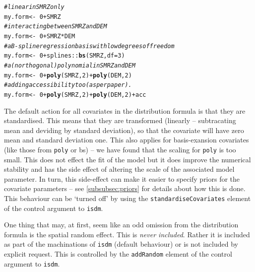 \documentclass[article,shortnames,nojss]{jss}\usepackage[]{graphicx}\usepackage[]{xcolor}
\makeatletter
\newcommand{\hlnum}[1]{\textcolor[rgb]{0.686,0.059,0.569}{#1}}%
\newcommand{\hlcom}[1]{\textcolor[rgb]{0.678,0.584,0.686}{\textit{#1}}}%
\newcommand{\hlopt}[1]{\textcolor[rgb]{0,0,0}{#1}}%
\newcommand{\hlstd}[1]{\textcolor[rgb]{0.345,0.345,0.345}{#1}}%
\newcommand{\hlkwb}[1]{\textcolor[rgb]{0.69,0.353,0.396}{#1}}%
\newcommand{\hlkwc}[1]{\textcolor[rgb]{0.333,0.667,0.333}{#1}}%
\newcommand{\hlkwd}[1]{\textcolor[rgb]{0.737,0.353,0.396}{\textbf{#1}}}%
\newenvironment{kframe}{%
 \def\at@end@of@kframe{}%
 \ifinner\ifhmode%
  \def\at@end@of@kframe{\end{minipage}}%
  \begin{minipage}{\columnwidth}%
 \fi\fi%
 \def\FrameCommand##1{\hskip\@totalleftmargin \hskip-\fboxsep
 \colorbox{shadecolor}{##1}\hskip-\fboxsep
     \hskip-\linewidth \hskip-\@totalleftmargin \hskip\columnwidth}%
 \MakeFramed {\advance\hsize-\width
   \@totalleftmargin\z@ \linewidth\hsize
   \@setminipage}}%
 {\par\unskip\endMakeFramed%
 \at@end@of@kframe}
\newenvironment{knitrout}{}{} %
\makeatother
\begin{document}
\begin{knitrout}
\color{fgcolor}\begin{kframe}
\begin{alltt}
\hlcom{#linear in SMRZ only}
\hlstd{my.form} \hlkwb{<-} \hlopt{~}\hlnum{0}\hlopt{+}\hlstd{SMRZ}
\hlcom{#interacting between SMRZ and DEM}
\hlstd{my.form} \hlkwb{<-} \hlopt{~}\hlnum{0}\hlopt{+}\hlstd{SMRZ}\hlopt{*}\hlstd{DEM}
\hlcom{#a B-spline regression basis with low degrees of freedom}
\hlstd{my.form} \hlkwb{<-} \hlopt{~}\hlnum{0}\hlopt{+}\hlstd{splines}\hlopt{::}\hlkwd{bs}\hlstd{(SMRZ,} \hlkwc{df}\hlstd{=}\hlnum{3}\hlstd{)}
\hlcom{#a(n orthogonal) polynomial in SMRZ and DEM}
\hlstd{my.form} \hlkwb{<-} \hlopt{~}\hlnum{0}\hlopt{+}\hlkwd{poly}\hlstd{(SMRZ,}\hlnum{2}\hlstd{)}\hlopt{+}\hlkwd{poly}\hlstd{(DEM,}\hlnum{2}\hlstd{)}
\hlcom{#adding accessibility too (as per paper).}
\hlstd{my.form} \hlkwb{<-} \hlopt{~}\hlnum{0}\hlopt{+}\hlkwd{poly}\hlstd{(SMRZ,}\hlnum{2}\hlstd{)}\hlopt{+}\hlkwd{poly}\hlstd{(DEM,}\hlnum{2}\hlstd{)}\hlopt{+}\hlstd{acc}
\end{alltt}
\end{kframe}
\end{knitrout}

The default action for all covariates in the distribution formula is that they are standardised. This means that they are transformed (linearly -- subtracating mean and deviding by standard deviation), so that the covariate will have zero mean and standard deviation one. This also applies for basis-exansion covariates (like those from \texttt{poly} or {bs}) -- we have found that the scaling for \texttt{poly} is too small. This does not effect the fit of the model but it does improve the numerical stability and has the side effect of altering the scale of the associated model parameter. In turn, this side-effect can make it easier to specify priors for the covariate parameters -- see \ref{subsubsec:priors} for details about how this is done. This behaviour can be `turned off' by using the \texttt{standardiseCovariates} element of the control argument to \texttt{isdm}.
  
One thing that may, at first, seem like an odd omission from the distribution formula is the spatial random effect. This is \textit{never included}. Rather it is included as part of the machinations of \texttt{isdm} (default behaviour) or is not included by explicit request. This is controlled by the \texttt{addRandom} element of the control argument to \texttt{isdm}. 
  
\end{document}

